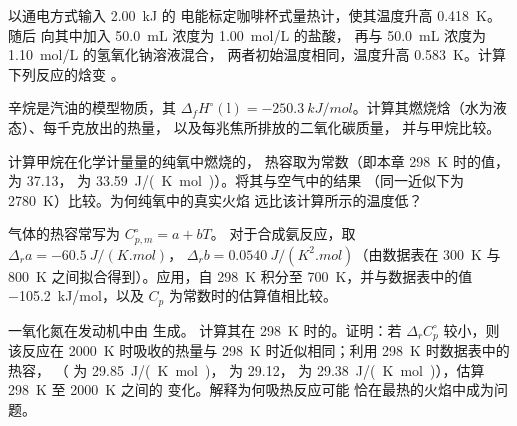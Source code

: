 \begin{exercise}[$\star\star$]\label{exo:b2:reaction-enthalpy:8}
以通电方式输入 \qty{2.00}{kJ} 的
电能标定咖啡杯式量热计，使其温度升高 \qty{0.418}{K}。随后
向其中加入 \qty{50.0}{mL} 浓度为 \qty{1.00}{mol/L} 的盐酸，
再与 \qty{50.0}{mL} 浓度为 \qty{1.10}{mol/L} 的氢氧化钠溶液混合，
两者初始温度相同，温度升高
\qty{0.583}{K}。计算下列反应的焓变 。
\end{exercise}

\begin{exercise}[$\star\star$]\label{exo:b2:reaction-enthalpy:9}
辛烷是汽油的模型物质，其 $\Delta_f H^\circ(\text{l}) =
\qty{-250.3}{kJ/mol}$。计算其燃烧焓（水为液态）、每千克放出的热量，
以及每兆焦所排放的二氧化碳质量，
并与甲烷比较。
\end{exercise}

\begin{exercise}[$\star\star\star$]\label{exo:b2:reaction-enthalpy:10}
计算甲烷在化学计量量的纯氧中燃烧的，
热容取为常数（即本章 \qty{298}{K} 时的值，
 为 37.13， 为
\qty{33.59}{J/(K.mol)}）。将其与空气中的结果
（同一近似下为 \qty{2780}{K}）比较。为何纯氧中的真实火焰
远比该计算所示的温度低？
\end{exercise}

\begin{exercise}[$\star\star\star$]\label{exo:b2:reaction-enthalpy:11}
气体的热容常写为 $C_{p,m}^\circ = a + bT$。
对于合成氨反应，取 $\Delta_r a = \qty{-60.5}{J/(K.mol)}$，
$\Delta_r b = \qty{0.0540}{J/(K^2.mol)}$（由数据表在
\qty{300}{K} 与 \qty{800}{K} 之间拟合得到）。应用，自
\qty{298}{K} 积分至 \qty{700}{K}，并与数据表中的值
\qty{-105.2}{kJ/mol}，以及 $C_p$ 为常数时的估算值相比较。
\end{exercise}

\begin{exercise}[$\star\star\star$]\label{exo:b2:reaction-enthalpy:12}
一氧化氮在发动机中由  生成。
计算其在 \qty{298}{K} 时的。证明：若
$\Delta_r C_p^\circ$ 较小，则该反应在
\qty{2000}{K} 时吸收的热量与 \qty{298}{K} 时近似相同；利用 \qty{298}{K} 时数据表中的热容，
（ 为 \qty{29.85}{J/(K.mol)}， 为 29.12，
为 \qty{29.38}{J/(K.mol)}），估算 \qty{298}{K} 至 \qty{2000}{K} 之间的
变化。解释为何吸热反应可能
恰在最热的火焰中成为问题。
\end{exercise}

